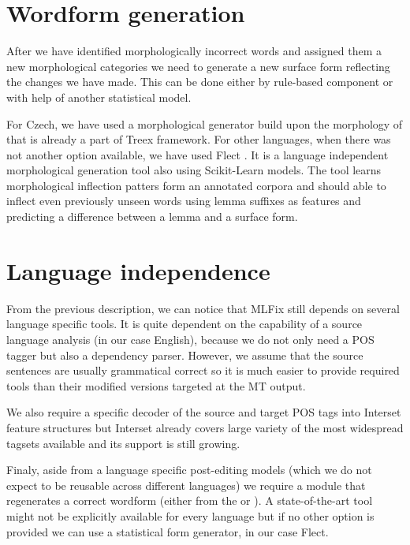 \section{Wordform generation}

After we have identified morphologically incorrect words and assigned
them a new morphological categories we need to generate a new surface form reflecting
the changes we have made.
This can be done either by rule-based component or with
help of another statistical model. 

For Czech, we have used a morphological generator build upon the morphology of \citet{HajicHAB2004}
that is already a part of Treex framework. For other languages,
when there was not another option available,
we have used Flect \citep{DBLP:conf/acl/DusekJ13}.
It is a language independent morphological generation tool also using Scikit-Learn
models. The tool learns morphological inflection patters form an annotated corpora and
should able to inflect even previously unseen words using lemma suffixes as features
and predicting a difference between a lemma and a surface form.

\section{Language independence}

From the previous description, we can notice that MLFix still depends on several
language specific tools. It is quite dependent on the capability of a source
language analysis (in our case English), because we do not only need a POS tagger but also a dependency
parser. However, we assume that the source sentences are usually grammatical correct
so it is much easier to provide required tools than their modified versions
targeted at the MT output.

We also require a specific decoder of the source and target POS tags into Interset feature
structures but Interset already covers large variety of the most widespread tagsets available
and its support is still growing.

Finaly, aside from a language specific post-editing models (which we do not expect
to be reusable across different languages) we require a module that regenerates
a correct wordform (either from the  or ).
A state-of-the-art tool might not be explicitly available for every language but if no
other option is provided we can use a statistical form generator, in our case Flect.
